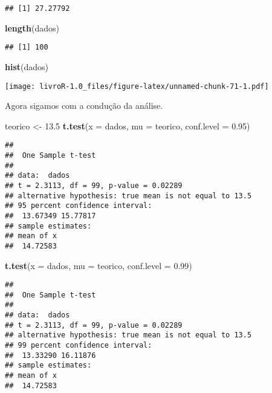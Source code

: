 \documentclass[]{book}
\newenvironment{Shaded}{\begin{snugshade}}{\end{snugshade}}
\newcommand{\DataTypeTok}[1]{\textcolor[rgb]{0.13,0.29,0.53}{#1}}
\newcommand{\FloatTok}[1]{\textcolor[rgb]{0.00,0.00,0.81}{#1}}
\newcommand{\KeywordTok}[1]{\textcolor[rgb]{0.13,0.29,0.53}{\textbf{#1}}}
\newcommand{\NormalTok}[1]{#1}
\newcommand{\StringTok}[1]{\textcolor[rgb]{0.31,0.60,0.02}{#1}}
\begin{document}
\begin{verbatim}
## [1] 27.27792
\end{verbatim}

\begin{Shaded}
\begin{Highlighting}[]
\KeywordTok{length}\NormalTok{(dados)}
\end{Highlighting}
\end{Shaded}

\begin{verbatim}
## [1] 100
\end{verbatim}

\begin{Shaded}
\begin{Highlighting}[]
\KeywordTok{hist}\NormalTok{(dados)}
\end{Highlighting}
\end{Shaded}

\texttt{[image: livroR-1.0\_files/figure-latex/unnamed-chunk-71-1.pdf]}

Agora sigamos com a condução da análise.

\begin{Shaded}
\begin{Highlighting}[]
\NormalTok{teorico <-}\StringTok{ }\FloatTok{13.5}
\KeywordTok{t.test}\NormalTok{(}\DataTypeTok{x =}\NormalTok{ dados, }\DataTypeTok{mu =}\NormalTok{ teorico, }\DataTypeTok{conf.level =} \FloatTok{0.95}\NormalTok{)}
\end{Highlighting}
\end{Shaded}

\begin{verbatim}
## 
##  One Sample t-test
## 
## data:  dados
## t = 2.3113, df = 99, p-value = 0.02289
## alternative hypothesis: true mean is not equal to 13.5
## 95 percent confidence interval:
##  13.67349 15.77817
## sample estimates:
## mean of x 
##  14.72583
\end{verbatim}

\begin{Shaded}
\begin{Highlighting}[]
\KeywordTok{t.test}\NormalTok{(}\DataTypeTok{x =}\NormalTok{ dados, }\DataTypeTok{mu =}\NormalTok{ teorico, }\DataTypeTok{conf.level =} \FloatTok{0.99}\NormalTok{)}
\end{Highlighting}
\end{Shaded}

\begin{verbatim}
## 
##  One Sample t-test
## 
## data:  dados
## t = 2.3113, df = 99, p-value = 0.02289
## alternative hypothesis: true mean is not equal to 13.5
## 99 percent confidence interval:
##  13.33290 16.11876
## sample estimates:
## mean of x 
##  14.72583
\end{verbatim}
\end{document}
